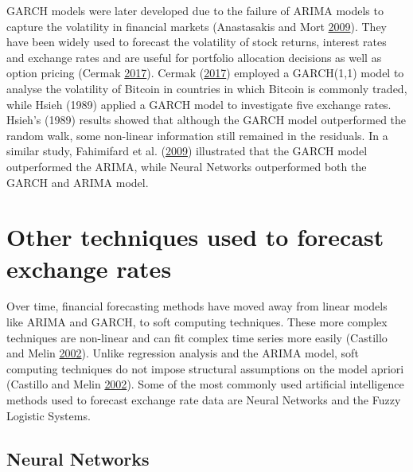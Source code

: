 \documentclass[12pt,preprint, authoryear]{elsarticle}
\numberwithin{equation}{section}
\numberwithin{figure}{section}
\numberwithin{table}{section}
\begin{document}
GARCH models were later developed due to the failure of ARIMA models to
capture the volatility in financial markets (Anastasakis and Mort
\protect\hyperlink{ref-anastasakis2009}{2009}). They have been widely
used to forecast the volatility of stock returns, interest rates and
exchange rates and are useful for portfolio allocation decisions as well
as option pricing (Cermak \protect\hyperlink{ref-cermak2017}{2017}).
Cermak (\protect\hyperlink{ref-cermak2017}{2017}) employed a GARCH(1,1)
model to analyse the volatility of Bitcoin in countries in which Bitcoin
is commonly traded, while Hsieh (1989) applied a GARCH model to
investigate five exchange rates. Hsieh's (1989) results showed that
although the GARCH model outperformed the random walk, some non-linear
information still remained in the residuals. In a similar study,
Fahimifard et al. (\protect\hyperlink{ref-fahimifard2009}{2009})
illustrated that the GARCH model outperformed the ARIMA, while Neural
Networks outperformed both the GARCH and ARIMA model.

\section{Other techniques used to forecast exchange
rates}\label{other-techniques-used-to-forecast-exchange-rates}

Over time, financial forecasting methods have moved away from linear
models like ARIMA and GARCH, to soft computing techniques. These more
complex techniques are non-linear and can fit complex time series more
easily (Castillo and Melin \protect\hyperlink{ref-castillo2002}{2002}).
Unlike regression analysis and the ARIMA model, soft computing
techniques do not impose structural assumptions on the model apriori
(Castillo and Melin \protect\hyperlink{ref-castillo2002}{2002}). Some of
the most commonly used artificial intelligence methods used to forecast
exchange rate data are Neural Networks and the Fuzzy Logistic Systems.

\subsection{Neural Networks}\label{neural-networks}
\end{document}
